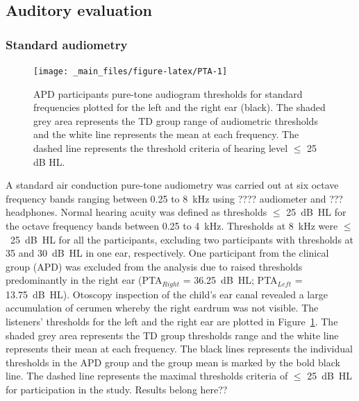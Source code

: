 \documentclass[a4paper, twoside]{templates/ociamthesis}
\begin{document}
\hypertarget{auditory-evaluation}{%
\subsection{Auditory evaluation}\label{auditory-evaluation}}

\hypertarget{standard-audiometry}{%
\subsubsection{Standard audiometry}\label{standard-audiometry}}

\begin{figure}

{\centering \texttt{[image: \_main\_files/figure-latex/PTA-1]} 

}

\caption{APD participants pure-tone audiogram thresholds for standard frequencies plotted for the left and the right ear (black). The shaded grey area represents the TD group range of audiometric thresholds and the white line represents the mean at each frequency. The dashed line represents the threshold criteria of hearing level $\leq$ 25 dB HL.}\label{fig:PTA}
\end{figure}

A standard air conduction pure-tone audiometry was carried out at six octave frequency bands ranging between 0.25 to 8~kHz using ???? audiometer and ??? headphones. Normal hearing acuity was defined as thresholds \(\leq\) 25~dB~HL for the octave frequency bands between 0.25 to 4~kHz. Thresholds at 8~kHz were \(\leq\)~25~dB~HL for all the participants, excluding two participants with thresholds at 35 and 30~dB~HL in one ear, respectively. One participant from the clinical group (APD) was excluded from the analysis due to raised thresholds predominantly in the right ear (PTA\(_{Right}\) = 36.25~dB~HL; PTA\(_{Left}\) = 13.75~dB~HL). Otoscopy inspection of the child's ear canal revealed a large accumulation of cerumen whereby the right eardrum was not visible. The listeners' thresholds for the left and the right ear are plotted in Figure~\ref{fig:PTA}. The shaded grey area represents the TD group thresholds range and the white line represents their mean at each frequency. The black lines represents the individual thresholds in the APD group and the group mean is marked by the bold black line. The dashed line represents the maximal thresholds criteria of \(\leq\) 25~dB~HL for participation in the study. \colorbox[HTML]{CCCCFF}{Results belong here??}
\end{document}
